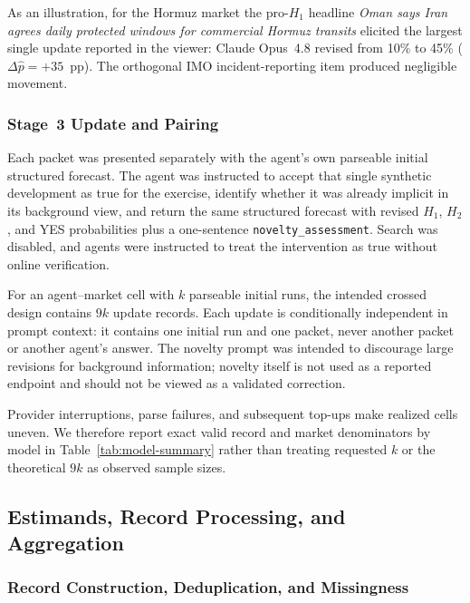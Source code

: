 As an illustration, for the Hormuz market the pro-$H_1$ headline
\textit{Oman says Iran agrees daily protected windows for commercial Hormuz transits}
elicited the largest single update reported in the viewer: Claude Opus~4.8 revised
from 10\% to 45\% (\(\Delta\hat p=+35\)~pp).  The orthogonal IMO
incident-reporting item produced negligible movement.

\subsubsection{Stage~3 Update and Pairing}
\label{app:update-protocol}

Each packet was presented separately with the agent's own parseable initial structured
forecast.  The agent was instructed to accept that single synthetic development as true
for the exercise, identify whether it was already implicit in its background view, and
return the same structured forecast with revised $H_1$, $H_2$, and YES probabilities
plus a one-sentence \texttt{novelty\_assessment}.  Search was disabled, and agents were instructed to treat the intervention as
true without online verification.

For an agent--market cell with \(k\) parseable initial runs, the intended crossed design
contains \(9k\) update records.  Each update is conditionally independent in prompt
context: it contains one initial run and one packet, never another packet or another
agent's answer.  The novelty prompt was intended to discourage large revisions for
background information; novelty itself is not used as a reported endpoint and should
not be viewed as a validated correction.

Provider interruptions, parse failures, and subsequent top-ups make realized cells
uneven.  We therefore report exact valid record and market denominators by model in
Table~\ref{tab:model-summary} rather than treating requested \(k\) or the theoretical
\(9k\) as observed sample sizes.

\subsection{Estimands, Record Processing, and Aggregation}
\label{app:metrics}

\subsubsection{Record Construction, Deduplication, and Missingness}
\label{app:record-processing}

